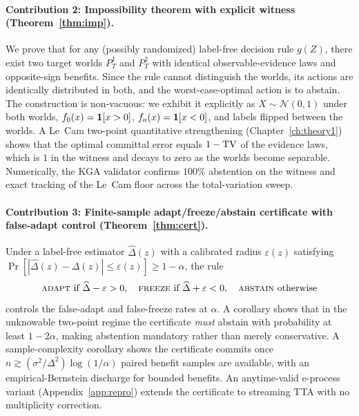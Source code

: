 \paragraph{Contribution 2: Impossibility theorem with explicit witness
(Theorem~\ref{thm:imp}).}
We prove that for any (possibly randomized) label-free decision rule
$g(Z)$, there exist two target worlds $P_T^1$ and $P_T^2$ with identical
observable-evidence laws and opposite-sign benefits.
Since the rule cannot distinguish the worlds, its actions are identically
distributed in both, and the worst-case-optimal action is to abstain.
The construction is non-vacuous: we exhibit it explicitly as $X \sim
\mathcal{N}(0,1)$ under both worlds, $f_0(x) = \mathbf{1}[x>0]$, $f_a(x) =
\mathbf{1}[x<0]$, and labels flipped between the worlds.
A Le~Cam two-point quantitative strengthening
(Chapter~\ref{ch:theory1}) shows that the optimal committal error equals
$1 - \mathrm{TV}$ of the evidence laws, which is $1$ in the witness and decays to
zero as the worlds become separable.
Numerically, the KGA validator confirms $100\%$ abstention on the witness
and exact tracking of the Le~Cam floor across the total-variation sweep.

\paragraph{Contribution 3: Finite-sample adapt/freeze/abstain certificate
with false-adapt control (Theorem~\ref{thm:cert}).}
Under a label-free estimator $\widehat{\Delta}(z)$ with a calibrated radius
$\varepsilon(z)$ satisfying $\Pr[|\widehat{\Delta}(z) - \Delta(z)| \leq
\varepsilon(z)] \geq 1 - \alpha$, the rule
\[
\textsc{adapt}\ \text{if}\ \widehat{\Delta} - \varepsilon > 0,\quad
\textsc{freeze}\ \text{if}\ \widehat{\Delta} + \varepsilon < 0,\quad
\textsc{abstain}\ \text{otherwise}
\]
controls the false-adapt and false-freeze rates at $\alpha$.
A corollary shows that in the unknowable two-point regime the certificate
\emph{must} abstain with probability at least $1 - 2\alpha$, making
abstention mandatory rather than merely conservative.
A sample-complexity corollary shows the certificate commits once $n \gtrsim
(\sigma^2 / \Delta^2) \log(1/\alpha)$ paired benefit samples are available,
with an empirical-Bernstein discharge for bounded benefits.
An anytime-valid e-process variant (Appendix~\ref{app:repro}) extends the
certificate to streaming TTA with no multiplicity correction.

